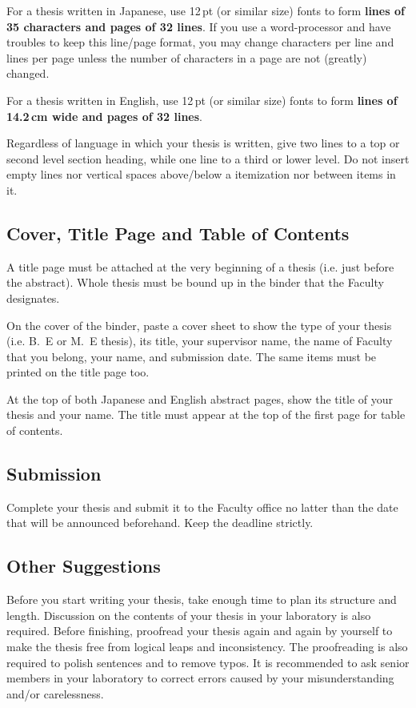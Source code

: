 \documentclass[english]{kuisthesis}
\let\EM\bf
\begin{document}
For a thesis written in Japanese, use 12\,pt (or similar size) fonts to form
{\EM lines of 35 characters and pages of 32 lines}.  If you use a
word-processor and have troubles to keep this line/page format, you may
change characters per line and lines per page unless the number of
characters in a page are not (greatly) changed.

For a thesis written in English, use 12\,pt (or similar size) fonts to form
{\EM lines of 14.2\,cm wide and pages of 32 lines}.

Regardless of language in which your thesis is written, give two lines to a
top or second level section heading, while one line to a third or lower
level.  Do not insert empty lines nor vertical spaces above/below a
itemization nor between items in it.

\subsection{Cover, Title Page and Table of Contents}\label{subsec-title}
A title page must be attached at the very beginning of a thesis (i.e. just
before the abstract).  Whole thesis must be bound up in the binder that the
Faculty designates.

On the cover of the binder, paste a cover sheet to show the type of your
thesis (i.e. B.~E or M.~E thesis), its title, your supervisor name, the name
of Faculty that you belong, your name, and submission date.  The
same items must be printed on the title page too.

At the top of both Japanese and English abstract pages, show the title of
your thesis and your name.  The title must appear at the top of the first
page for table of contents.

\subsection{Submission}\label{subsec-submission}
Complete your thesis and submit it to the Faculty office no latter than
the date that will be announced beforehand.  Keep the deadline strictly.

\subsection{Other Suggestions}\label{subsec-others}
Before you start writing your thesis, take enough time to plan its structure
and length.  Discussion on the contents of your thesis in your laboratory is
also required.  Before finishing, proofread your thesis again and again by
yourself to make the thesis free from logical leaps and inconsistency.  The
proofreading is also required to polish sentences and to remove typos.  It
is recommended to ask senior members in your laboratory to correct errors
caused by your misunderstanding and/or carelessness.
\end{document}
